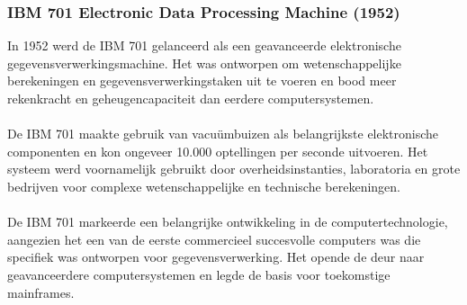 \subsubsection{IBM 701 Electronic Data Processing Machine (1952)}
\label{sec:IBM 701 Electronic Data Processing Machine}
In 1952 werd de IBM 701 gelanceerd als een geavanceerde elektronische gegevensverwerkingsmachine. Het was ontworpen om wetenschappelijke berekeningen en gegevensverwerkingstaken uit te voeren en bood meer rekenkracht en geheugencapaciteit dan eerdere computersystemen. \autocite{IBM1952}
\\
\\
De IBM 701 maakte gebruik van vacuümbuizen als belangrijkste elektronische componenten en kon ongeveer 10.000 optellingen per seconde uitvoeren. Het systeem werd voornamelijk gebruikt door overheidsinstanties, laboratoria en grote bedrijven voor complexe wetenschappelijke en technische berekeningen. \autocite{IBM1952}
\\
\\
De IBM 701 markeerde een belangrijke ontwikkeling in de computertechnologie, aangezien het een van de eerste commercieel succesvolle computers was die specifiek was ontworpen voor gegevensverwerking. Het opende de deur naar geavanceerdere computersystemen en legde de basis voor toekomstige mainframes. \autocite{IBM1952}
\\
\\
